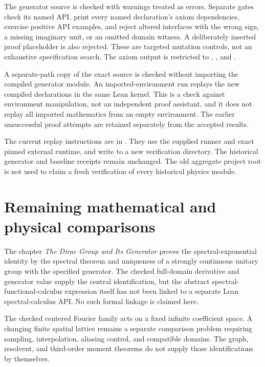 The generator source is checked with warnings treated as errors. Separate gates check its named API, print every named declaration's axiom dependencies, exercise positive API examples, and reject altered interfaces with the wrong sign, a missing imaginary unit, or an omitted domain witness. A deliberately inserted proof placeholder is also rejected. These are targeted mutation controls, not an exhaustive specification search. The axiom output is restricted to , , and .

A separate-path copy of the exact source is checked without importing the compiled generator module. An imported-environment  run replays the new compiled declarations in the same Lean kernel. This is a check against environment manipulation, not an independent proof assistant, and it does not replay all imported mathematics from an empty environment. The earlier unsuccessful proof attempts are retained separately from the accepted results.

The current replay instructions are in . They use the supplied runner and exact pinned external runtime, and write to a new verification directory. The historical generator and baseline receipts remain unchanged. The old aggregate project root is not used to claim a fresh verification of every historical physics module.



\section{Remaining mathematical and physical comparisons}

The chapter \emph{The Dirac Group and Its Generator} proves the spectral-exponential identity by the spectral theorem and uniqueness of a strongly continuous unitary group with the specified generator. The checked full-domain derivative and generator value supply the central identification, but the abstract spectral-functional-calculus expression itself has not been linked to a separate Lean spectral-calculus API. No such formal linkage is claimed here.

The checked centered Fourier family acts on a fixed infinite coefficient space. A changing finite spatial lattice remains a separate comparison problem requiring sampling, interpolation, aliasing control, and compatible domains. The graph, resolvent, and third-order moment theorems do not supply those identifications by themselves.

